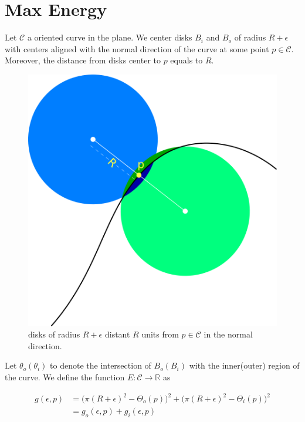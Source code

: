 \chapter{Max Energy}\label{chapter:max-energy}

Let $\mathcal{C}$ a oriented curve in the plane. We center disks $B_i$ and $B_o$ of radius $R+\epsilon$ with centers aligned with the normal direction of the curve at some point $p \in \mathcal{C}$. Moreover, the distance from disks center to $p$ equals to $R$.

\begin{figure}[h!]\label{fig:r-separated-disks}
\center
\includegraphics[scale=0.35]{figures/max-energy/r-separated-disks.png}
\caption{disks of radius $R+\epsilon$ distant $R$ units from $p\in \mathcal{C}$ in the normal direction.}
\end{figure}


Let $\theta_o (\theta_i)$ to denote the intersection of $B_o(B_i)$ with the inner(outer) region of the curve. We define the function $E:\mathcal{C}\rightarrow \mathbb{R}$ as

\begin{align*}
	g(\epsilon,p) &= \big( \pi (R+\epsilon)^2 - \Theta_o(p)\big)^2 + \big(\pi (R+\epsilon)^2 - \Theta_i(p) )^2\\
		 &= g_o(\epsilon,p) + g_i(\epsilon,p)
\end{align*}


